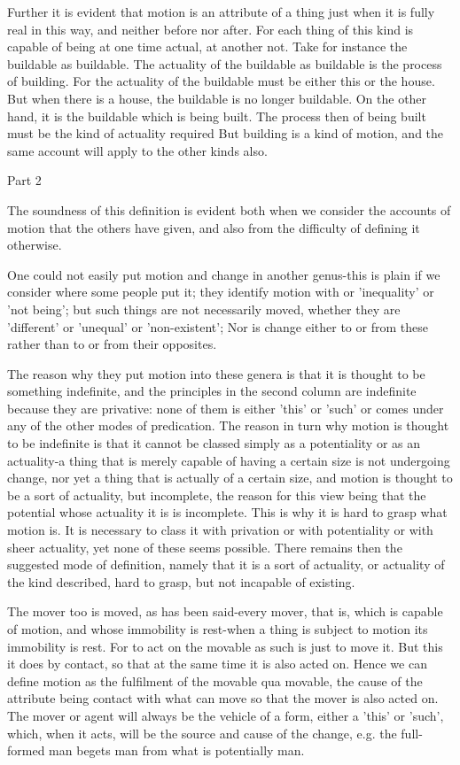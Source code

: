 Further it is evident that motion is an attribute of a thing just
when it is fully real in this way, and neither before nor after. For
each thing of this kind is capable of being at one time actual, at
another not. Take for instance the buildable as buildable. The actuality
of the buildable as buildable is the process of building. For the
actuality of the buildable must be either this or the house. But when
there is a house, the buildable is no longer buildable. On the other
hand, it is the buildable which is being built. The process then of
being built must be the kind of actuality required But building is
a kind of motion, and the same account will apply to the other kinds
also. 

Part 2

The soundness of this definition is evident both when we consider
the accounts of motion that the others have given, and also from the
difficulty of defining it otherwise. 

One could not easily put motion and change in another genus-this is
plain if we consider where some people put it; they identify motion
with or 'inequality' or 'not being'; but such things are not necessarily
moved, whether they are 'different' or 'unequal' or 'non-existent';
Nor is change either to or from these rather than to or from their
opposites. 

The reason why they put motion into these genera is that it is thought
to be something indefinite, and the principles in the second column
are indefinite because they are privative: none of them is either
'this' or 'such' or comes under any of the other modes of predication.
The reason in turn why motion is thought to be indefinite is that
it cannot be classed simply as a potentiality or as an actuality-a
thing that is merely capable of having a certain size is not undergoing
change, nor yet a thing that is actually of a certain size, and motion
is thought to be a sort of actuality, but incomplete, the reason for
this view being that the potential whose actuality it is is incomplete.
This is why it is hard to grasp what motion is. It is necessary to
class it with privation or with potentiality or with sheer actuality,
yet none of these seems possible. There remains then the suggested
mode of definition, namely that it is a sort of actuality, or actuality
of the kind described, hard to grasp, but not incapable of existing.

The mover too is moved, as has been said-every mover, that is, which
is capable of motion, and whose immobility is rest-when a thing is
subject to motion its immobility is rest. For to act on the movable
as such is just to move it. But this it does by contact, so that at
the same time it is also acted on. Hence we can define motion as the
fulfilment of the movable qua movable, the cause of the attribute
being contact with what can move so that the mover is also acted on.
The mover or agent will always be the vehicle of a form, either a
'this' or 'such', which, when it acts, will be the source and cause
of the change, e.g. the full-formed man begets man from what is potentially
man. 

